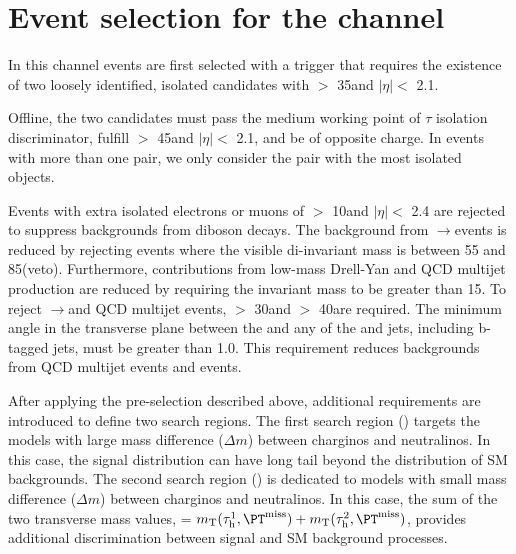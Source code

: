 \section{\texorpdfstring{Event selection for the \tauTau channel}{Event selection for the tau-tau channel}}
\label{sect:tauTauCuts}
In this channel events are first selected with a trigger \cite{Khachatryan:2015hwa,Chatrchyan:2012xi,Chatrchyan:2011nv}
that requires the existence of
two loosely identified, isolated \Tau candidates with \PT $>$ 35\GeV and $|\eta|<$ 2.1.   

Offline, the two \Tau candidates must pass the medium working point
\cite{Khachatryan:2015dfa} of $\tau$ isolation discriminator, 
fulfill \PT $>$ 45\GeV and $|\eta|<$ 2.1, and be of opposite charge.
In events with more than one \tauTau pair, we only consider the pair with the most isolated \Tau objects. 

Events with extra isolated electrons or muons of \PT $>$ 10\GeV and $|\eta| <$ 2.4 
are rejected to suppress %
backgrounds from diboson decays.
The background from \Z$\rightarrow$\tauTau events is reduced by rejecting events where the visible
di-\Tau invariant mass is between 55 and 85\GeV (\Z veto).  
Furthermore, contributions from low-mass Drell-Yan and QCD multijet production are 
reduced by requiring the invariant mass to be greater than 15\GeV.
To reject \Z$\rightarrow$\tauTau and QCD multijet events, %
\MPT $>$ 30\GeV and \mttwo $>$ 40\GeV are required.
The minimum angle \deltaphi in the transverse plane between the \ptvecmiss and any of the \Tau and jets, 
including b-tagged jets, must be greater than 1.0. 
This requirement reduces backgrounds from QCD multijet events and \wjets events.

After applying the pre-selection described above,
additional requirements are introduced to define two search regions.
The first search region (\binone) targets the models with large mass difference ($\Delta m$) 
between charginos and neutralinos.
In this case, the \mttwo signal distribution can have long tail beyond the 
distribution of SM backgrounds.
The second search region (\bintwo) is dedicated to models with small mass difference ($\Delta m$) 
between charginos and neutralinos.  
In this case, the sum of the two transverse mass values, \SumMT = $\mt(\Tau^1,\MPT) + \mt(\Tau^2,\MPT)$, 
provides additional discrimination between signal and SM background processes.

